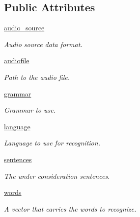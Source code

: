 \subsection*{Public Attributes}
\begin{DoxyCompactItemize}
\item 
\hyperlink{classRappCloud_1_1CloudMsgs_1_1SpeechRecognitionSphinx_1_1SpeechRecognitionSphinx_1_1Request_a72a2d7ca799d9b01aa6e6bf9bb8ca8bd}{audio\-\_\-source}
\begin{DoxyCompactList}\small\item\em Audio source data format. \end{DoxyCompactList}\item 
\hyperlink{classRappCloud_1_1CloudMsgs_1_1SpeechRecognitionSphinx_1_1SpeechRecognitionSphinx_1_1Request_a92f77c3f113ec79ef2983c68c5c975f5}{audiofile}
\begin{DoxyCompactList}\small\item\em Path to the audio file. \end{DoxyCompactList}\item 
\hyperlink{classRappCloud_1_1CloudMsgs_1_1SpeechRecognitionSphinx_1_1SpeechRecognitionSphinx_1_1Request_a6a4e3a439858eecc8f34d1b90819fa57}{grammar}
\begin{DoxyCompactList}\small\item\em Grammar to use. \end{DoxyCompactList}\item 
\hyperlink{classRappCloud_1_1CloudMsgs_1_1SpeechRecognitionSphinx_1_1SpeechRecognitionSphinx_1_1Request_ab0ae85efc663177ca81f7197f8a18606}{language}
\begin{DoxyCompactList}\small\item\em Language to use for recognition. \end{DoxyCompactList}\item 
\hyperlink{classRappCloud_1_1CloudMsgs_1_1SpeechRecognitionSphinx_1_1SpeechRecognitionSphinx_1_1Request_aa24acc8a7cc67efde78f2ebebf2163e7}{sentences}
\begin{DoxyCompactList}\small\item\em The under consideration sentences. \end{DoxyCompactList}\item 
\hyperlink{classRappCloud_1_1CloudMsgs_1_1SpeechRecognitionSphinx_1_1SpeechRecognitionSphinx_1_1Request_a53b695c6df5781eadffdf0c633b48f91}{words}
\begin{DoxyCompactList}\small\item\em A vector that carries the words to recognize. \end{DoxyCompactList}\end{DoxyCompactItemize}


